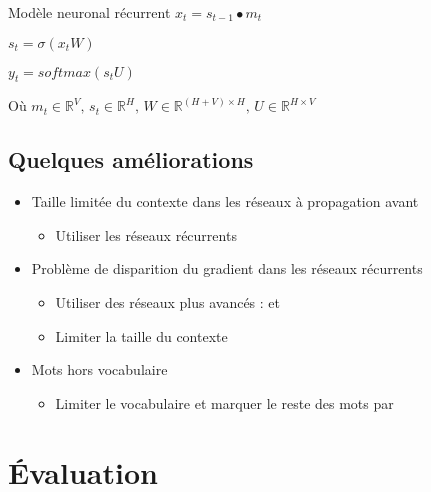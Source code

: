 \documentclass{KodeBook}
\begin{document}
\begin{block}{Modèle neuronal récurrent}
	$x_t = s_{t-1} \bullet m_t$
	
	$s_t = \sigma(x_t W)$
	
	$y_t = softmax(s_t U)$
	
	Où $m_t \in \mathbb{R}^{V},\, s_t \in \mathbb{R}^{H},\, W \in \mathbb{R}^{(H+V)\times H},\, U \in \mathbb{R}^{H\times V}$
\end{block}

\begin{figure}[ht]
	\centering
\end{figure}


\subsection{Quelques améliorations}

\begin{itemize}
	\item Taille limitée du contexte dans les réseaux à propagation avant
	\begin{itemize}
		\item Utiliser les réseaux récurrents
	\end{itemize}
	\item Problème de disparition du gradient dans les réseaux récurrents
	\begin{itemize}
		\item Utiliser des réseaux plus avancés :  et 
		\item Limiter la taille du contexte 
	\end{itemize}
	\item Mots hors vocabulaire
	\begin{itemize}
		\item Limiter le vocabulaire  et marquer le reste des mots par 
	\end{itemize}
\end{itemize}

\section{Évaluation}
\end{document}
